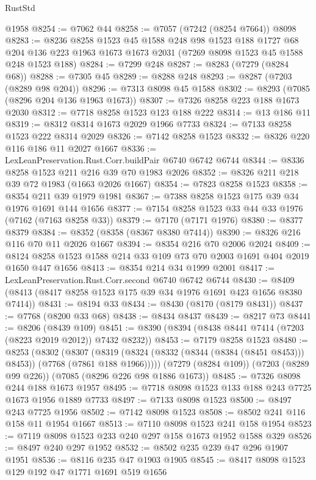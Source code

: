 \begin{lexlean}{RustStd}
\begin{coremodule}
{\begin{coremodule}
{{{{{{{{{{{{{{{{{{{{{{{{{{{{{{{{{{{{{{{{{{{{    @1958
@8254 := @7062 @44
@8258 := @7057 (@7242 (@8254 @7664)) @8098
@8283 := @8236
    @8258
    @1523
    @45
    @1588
    @248
    @98
    @1523
    @188
    @1727
    @68
    @204
    @136
    @223
    @1963
    @1673
    @1673
    @2031
    (@7269 @8098 @1523 @45 @1588 @248 @1523 @188)
@8284 := @7299 @248
@8287 := @8283 (@7279 (@8284 @68))
@8288 := @7305 @45
@8289 := @8288 @248
@8293 := @8287 (@7203 (@8289 @98 @204))
@8296 := @7313 @8098 @45 @1588
@8302 := @8293 (@7085 (@8296 @204 @136 @1963 @1673))
@8307 := @7326 @8258 @223 @188 @1673 @2030
@8312 := @7718 @8258 @1523 @123 @188 @222
@8314 := @13 @186 @11
@8319 := @8312 @8314 @1673 @2029 @1966 @7733
@8324 := @7133 @8258 @1523 @222 @8314 @2029
@8326 := @7142 @8258 @1523
@8332 := @8326 @220 @116 @186 @11 @2027 @1667
@8336 := LexLeanPreservation.Rust.Corr.buildPair @6740 @6742 @6744
@8344 := @8336 @8258 @1523 @211 @216 @39 @70 @1983 @2026
@8352 := @8326 @211 @218 @39 @72 @1983 (@1663 @2026 @1667)
@8354 := @7823 @8258 @1523
@8358 := @8354 @211 @39 @1979 @1981
@8367 := @7388 @8258 @1523 @175 @39 @34 @1976 @1691 @144 @1656
@8377 := @7154 @8258 @1523 @33 @44 @33 @1976 (@7162 (@7163 @8258 @33))
@8379 := @7170 (@7171 @1976)
@8380 := @8377 @8379
@8384 := @8352 (@8358 (@8367 @8380 @7414))
@8390 := @8326 @216 @116 @70 @11 @2026 @1667
@8394 := @8354 @216 @70 @2006 @2024
@8409 := @8124 @8258 @1523 @1588 @214 @33 @109 @73 @70 @2003 @1691 @404 @2019 @1650 @447 @1656
@8413 := @8354 @214 @34 @1999 @2001
@8417 := LexLeanPreservation.Rust.Corr.second @6740 @6742 @6744
@8430 := @8409 (@8413 (@8417 @8258 @1523 @175 @39 @34 @1976 @1691 @423 @1656 @8380 @7414))
@8431 := @8194 @33
@8434 := @8430 (@8170 (@8179 @8431))
@8437 := @7768 (@8200 @33 @68)
@8438 := @8434 @8437
@8439 := @8217 @73
@8441 := @8206 (@8439 @109)
@8451 := @8390 (@8394 (@8438 @8441 @7414 (@7203 (@8223 @2019 @2012)) @7432 @8232))
@8453 := @7179 @8258 @1523
@8480 := @8253
    (@8302
      (@8307
        (@8319 (@8324 (@8332 (@8344 (@8384 (@8451 @8453))) @8453)) (@7768 (@7861 @188 @1966)))))
    (@7279 (@8284 @109))
    (@7203 (@8289 @99 @226))
    (@7085 (@8296 @226 @98 @1886 @1673))
@8485 := @7326 @8098 @244 @188 @1673 @1957
@8495 := @7718 @8098 @1523 @133 @188 @243 @7725 @1673 @1956 @1889 @7733
@8497 := @7133 @8098 @1523
@8500 := @8497 @243 @7725 @1956
@8502 := @7142 @8098 @1523
@8508 := @8502 @241 @116 @158 @11 @1954 @1667
@8513 := @7110 @8098 @1523 @241 @158 @1954
@8523 := @7119 @8098 @1523 @233 @240 @297 @158 @1673 @1952 @1588 @329
@8526 := @8497 @240 @297 @1952
@8532 := @8502 @235 @239 @47 @296 @1907 @1951
@8536 := @8116 @235 @47 @1903 @1905
@8545 := @8417 @8098 @1523 @129 @192 @47 @1771 @1691 @519 @1656
}}}}}}}}}}}}}}}}}}}}}}}}}}}}}}}}}}}}}}}}}}}}
\end{coremodule}}
\end{coremodule}
\end{lexlean}
